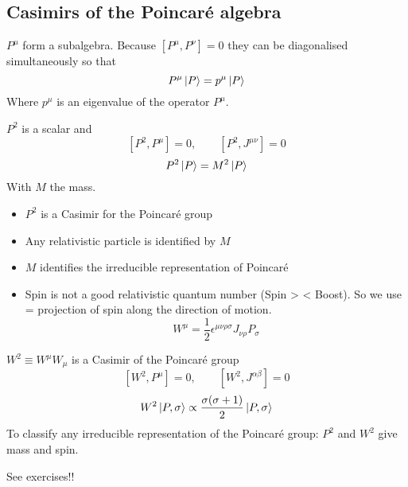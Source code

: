 \subsection{Casimirs of the Poincaré algebra}
$P^\mu$ form a subalgebra. Because $\left[P^\mu, P^\nu\right] = 0$ they can be diagonalised simultaneously so that
\[ P^\mu\left| P \right\rangle = p^\mu\left| P \right\rangle \]
Where $p^\mu$ is an eigenvalue of the operator $P^\mu$.

$P^2$ is a scalar and
\[ \left[P^2, P^\mu\right] = 0, \qquad \left[P^2, J^{\mu\nu}\right] = 0 \]
\[ P^2\left| P \right\rangle = M^2\left| P \right\rangle \]
With $M$ the mass.
\begin{itemize}
\item $P^2$ is a Casimir for the Poincaré group
\item Any relativistic particle is identified by $M$
\item $M$ identifies the irreducible representation of Poincaré
\item Spin is not a good relativistic quantum number (Spin > < Boost). So we use  = projection of spin along the direction of motion.
\[ \boxed{W^\mu = \frac{1}{2}\epsilon^{\mu\nu\rho\sigma}J_{\nu\rho}P_{\sigma}} \]
\end{itemize}
$W^2 \equiv W^\mu W_\mu$ is a Casimir of the Poincaré group
\[ \left[W^2, P^\mu\right] = 0, \qquad \left[W^2,J^{\alpha\beta}\right] = 0 \]
\[ W^2\left| P,\sigma \right\rangle \propto \frac{\sigma(\sigma+1)}{2}\left| P,\sigma \right\rangle \]
To classify any irreducible representation of the Poincaré group: $P^2$ and $W^2$ give mass and spin.

See exercises!!